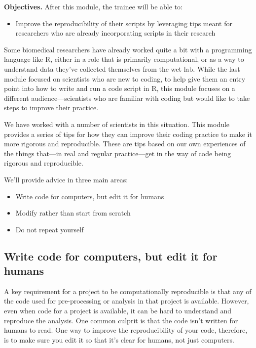 \documentclass[]{tufte-book}
\providecommand{\tightlist}{%
  \setlength{\itemsep}{0pt}\setlength{\parskip}{0pt}}
\begin{document}
\textbf{Objectives.} After this module, the trainee will be able to:

\begin{itemize}
\tightlist
\item
  Improve the reproducibility of their scripts by leveraging tips meant for
  researchers who are already incorporating scripts in their research
\end{itemize}

Some biomedical researchers have already worked quite a bit with a programming
language like R, either in a role that is primarily computational, or as a
way to understand data they've collected themselves from the wet lab. While
the last module focused on scientists who are new to coding, to help give them
an entry point into how to write and run a code script in R, this module
focuses on a different audience---scientists who are familiar with coding but
would like to take steps to improve their practice.

We have worked with a number of scientists in this situation. This module
provides a series of tips for how they can improve their coding practice to
make it more rigorous and reproducible. These are tips based on our own
experiences of the things that---in real and regular practice---get in the
way of code being rigorous and reproducible.

We'll provide advice in three main areas:

\begin{itemize}
\tightlist
\item
  Write code for computers, but edit it for humans
\item
  Modify rather than start from scratch
\item
  Do not repeat yourself
\end{itemize}

\subsection{Write code for computers, but edit it for humans}\label{write-code-for-computers-but-edit-it-for-humans}

A key requirement for a project to be computationally reproducible is that any
of the code used for pre-processing or analysis in that project is available.
However, even when code for a project is available, it can be hard to understand
and reproduce the analysis. One common culprit is that the code isn't written
for humans to read. One way to improve the reproducibility of your code,
therefore, is to make sure you edit it so that it's clear for humans, not just
computers.
\end{document}
